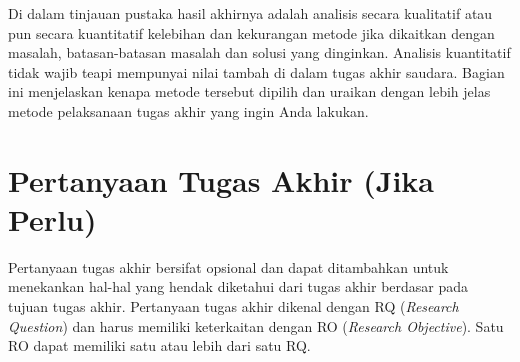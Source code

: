 Di dalam tinjauan pustaka hasil akhirnya adalah analisis secara kualitatif atau pun secara kuantitatif kelebihan dan kekurangan metode jika dikaitkan dengan masalah, batasan-batasan masalah dan solusi yang dinginkan. Analisis kuantitatif tidak wajib teapi mempunyai nilai tambah di dalam tugas akhir saudara. Bagian ini menjelaskan kenapa metode tersebut dipilih dan uraikan dengan lebih jelas metode pelaksanaan tugas akhir yang ingin Anda lakukan. 

\section{Pertanyaan Tugas Akhir (Jika Perlu)}
\label{sec:pertanyaan_ta_revised}

Pertanyaan tugas akhir bersifat opsional dan dapat ditambahkan untuk menekankan hal-hal yang hendak diketahui dari tugas akhir berdasar pada tujuan tugas akhir. Pertanyaan tugas akhir dikenal dengan RQ (\textit{Research Question}) dan harus memiliki keterkaitan dengan RO (\textit{Research Objective}). Satu RO dapat memiliki satu atau lebih dari satu RQ.
